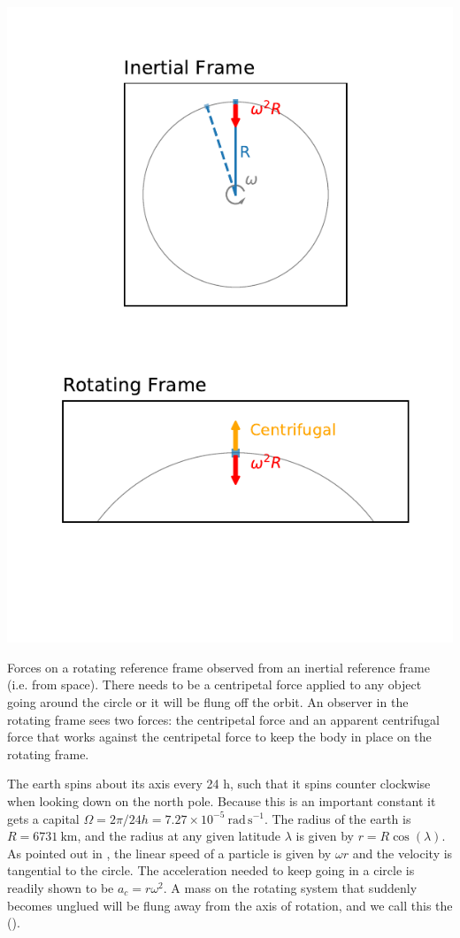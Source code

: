 \begin{marginfigure}
    \includegraphics{figs/Coriolis/CentrifugalForceCor}
    \caption{Forces on a rotating reference frame observed from an inertial reference frame (i.e. from space).  There needs to be a centripetal force applied to any object going around the circle or it will be flung off the orbit.  An observer in the rotating frame sees two forces: the centripetal force and an apparent centrifugal force that works against the centripetal force to keep the body in place on the rotating frame.}
    \label{fig:CentrifugalForceCor}  
\end{marginfigure}

 
The earth spins about its axis every 24 h, such that it spins counter clockwise when looking down on the north pole.  Because this is an important constant it gets a capital $\Omega = 2\pi/24h =7.27\times10^{-5}\ \mathrm{rad\,s^{-1}}$.  The radius of the earth is $R=6731 \ \mathrm{km}$, and the radius at any given latitude $\lambda$ is given by $r = R\cos(\lambda)$.  As pointed out in , the linear speed of a particle is given by $\omega r$ and the velocity is tangential to the circle.  The acceleration needed to keep going in a circle is readily shown to be $a_c = r \omega^2$.  A mass on the rotating system that suddenly becomes unglued will be flung away from the axis of rotation, and we call this the  ().

